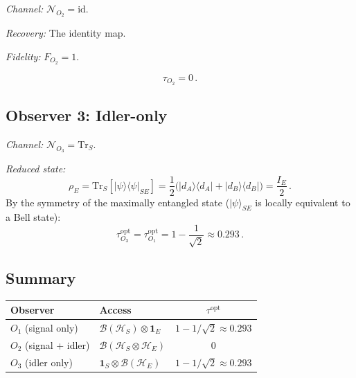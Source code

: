 \documentclass[aps,prd,preprint,superscriptaddress,longbibliography]{revtex4-2}
\newcommand{\Tr}{\mathrm{Tr}}
\newcommand{\id}{\mathrm{id}}
\newcommand{\chan}{\mathcal{N}}
\newcommand{\hilb}{\mathcal{H}}
\newcommand{\ket}[1]{|#1\rangle}
\newcommand{\bra}[1]{\langle#1|}
\newcommand{\op}[2]{|#1\rangle\langle#2|}
\newcommand{\tauasym}{\tau}
\begin{document}
\emph{Channel:} $\chan_{O_2} = \id$.

\emph{Recovery:} The identity map.

\emph{Fidelity:} $F_{O_2} = 1$.

\begin{equation}
  \tauasym_{O_2} = 0\,.
  \label{eq:tau_O2}
\end{equation}

\subsection{Observer 3: Idler-only}

\emph{Channel:} $\chan_{O_3} = \Tr_S$.

\emph{Reduced state:}
\begin{equation}
  \rho_E = \Tr_S[\ket{\psi}\!\bra{\psi}_{SE}]
  = \frac{1}{2}\big(\op{d_A}{d_A} + \op{d_B}{d_B}\big)
  = \frac{I_E}{2}\,.
  \label{eq:rho_E}
\end{equation}
By the symmetry of the maximally entangled state
($\ket{\psi}_{SE}$ is locally equivalent to a Bell state):
\begin{equation}
  \tauasym_{O_3}^{\mathrm{opt}} = \tauasym_{O_1}^{\mathrm{opt}}
  = 1 - \frac{1}{\sqrt{2}} \approx 0.293\,.
  \label{eq:tau_O3}
\end{equation}

\subsection{Summary}

\begin{center}
\begin{tabular}{llc}
\toprule
\textbf{Observer} & \textbf{Access} & $\tauasym^{\mathrm{opt}}$ \\
\midrule
$O_1$ (signal only) & $\mathcal{B}(\hilb_S)\otimes\mathbf{1}_E$
  & $1 - 1/\sqrt{2} \approx 0.293$ \\
$O_2$ (signal + idler) & $\mathcal{B}(\hilb_S\otimes\hilb_E)$
  & $0$ \\
$O_3$ (idler only) & $\mathbf{1}_S\otimes\mathcal{B}(\hilb_E)$
  & $1 - 1/\sqrt{2} \approx 0.293$ \\
\bottomrule
\end{tabular}
\end{center}
\end{document}
